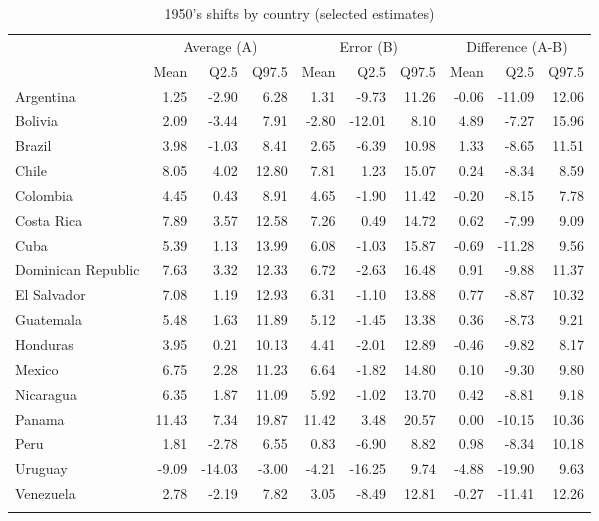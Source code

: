 \renewcommand{\arraystretch}{1.2}
\setlength{\tabcolsep}{10pt}
\begin{table}[htp]
\centering
\caption{1950's shifts by country (selected estimates)} 
\label{tab:shift_1950_selected}
\scriptsize
\begin{tabular}{lrrrrrrrrr}
  \hline
  \addlinespace
    & \multicolumn{3}{c}{Average (A)}  & \multicolumn{3}{c}{Error (B)} & \multicolumn{3}{c}{Difference (A-B)}  \\
    \cmidrule(lr){2-4}\cmidrule(lr){5-7}\cmidrule(lr){8-10}
 & Mean & Q2.5 & Q97.5 & Mean & Q2.5 & Q97.5 & Mean & Q2.5 & Q97.5 \\ 
 \addlinespace
  \hline
\addlinespace 
Argentina & 1.25 & -2.90 & 6.28 & 1.31 & -9.73 & 11.26 & -0.06 & -11.09 & 12.06 \\ 
  Bolivia & 2.09 & -3.44 & 7.91 & -2.80 & -12.01 & 8.10 & 4.89 & -7.27 & 15.96 \\ 
  Brazil & 3.98 & -1.03 & 8.41 & 2.65 & -6.39 & 10.98 & 1.33 & -8.65 & 11.51 \\ 
  Chile & 8.05 & 4.02 & 12.80 & 7.81 & 1.23 & 15.07 & 0.24 & -8.34 & 8.59 \\ 
  Colombia & 4.45 & 0.43 & 8.91 & 4.65 & -1.90 & 11.42 & -0.20 & -8.15 & 7.78 \\ 
  Costa Rica & 7.89 & 3.57 & 12.58 & 7.26 & 0.49 & 14.72 & 0.62 & -7.99 & 9.09 \\ 
  Cuba & 5.39 & 1.13 & 13.99 & 6.08 & -1.03 & 15.87 & -0.69 & -11.28 & 9.56 \\ 
  Dominican Republic & 7.63 & 3.32 & 12.33 & 6.72 & -2.63 & 16.48 & 0.91 & -9.88 & 11.37 \\ 
  El Salvador & 7.08 & 1.19 & 12.93 & 6.31 & -1.10 & 13.88 & 0.77 & -8.87 & 10.32 \\ 
  Guatemala & 5.48 & 1.63 & 11.89 & 5.12 & -1.45 & 13.38 & 0.36 & -8.73 & 9.21 \\ 
  Honduras & 3.95 & 0.21 & 10.13 & 4.41 & -2.01 & 12.89 & -0.46 & -9.82 & 8.17 \\ 
  Mexico & 6.75 & 2.28 & 11.23 & 6.64 & -1.82 & 14.80 & 0.10 & -9.30 & 9.80 \\ 
  Nicaragua & 6.35 & 1.87 & 11.09 & 5.92 & -1.02 & 13.70 & 0.42 & -8.81 & 9.18 \\ 
  Panama & 11.43 & 7.34 & 19.87 & 11.42 & 3.48 & 20.57 & 0.00 & -10.15 & 10.36 \\ 
  Peru & 1.81 & -2.78 & 6.55 & 0.83 & -6.90 & 8.82 & 0.98 & -8.34 & 10.18 \\ 
  Uruguay & -9.09 & -14.03 & -3.00 & -4.21 & -16.25 & 9.74 & -4.88 & -19.90 & 9.63 \\ 
  Venezuela & 2.78 & -2.19 & 7.82 & 3.05 & -8.49 & 12.81 & -0.27 & -11.41 & 12.26 \\ 
    \addlinespace
\hline
\end{tabular}
\end{table}
